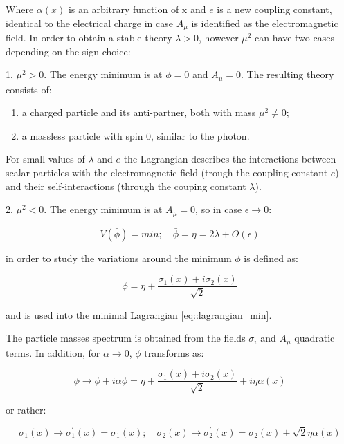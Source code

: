 Where $\alpha(x)$ is an arbitrary function of x and $e$ is a new coupling constant, identical to the electrical charge in case $A_{\mu}$ is identified as the electromagnetic field. In order to obtain a stable theory $\lambda > 0$, however $\mu^{2}$ can have two cases depending on the sign choice:
 
1. $\mu^{2} > 0$. The energy minimum is at $\phi = 0$ and $A_{\mu} = 0$. The resulting theory consists of:

\begin{enumerate}
	\item a charged particle and its anti-partner, both with mass $\mu^{2} \neq 0$;
	\item a massless particle with spin 0, similar to the photon.
\end{enumerate}

For small values of $\lambda$ and $e$ the Lagrangian describes the interactions between scalar particles with the electromagnetic field (trough the coupling constant $e$) and their self-interactions (through the couping constant $\lambda$).

2. $\mu^{2} < 0$. The energy minimum is at $A_{\mu} = 0$, so in  case $\epsilon \rightarrow 0$:

\begin{equation}
V(\bar{\phi})=min ; \quad \bar{\phi}=\eta= 2\lambda +O(\epsilon)
\end{equation}
 
 in order to study the  variations around the minimum $\phi$ is defined as:

\begin{equation}
 \phi=\eta + \dfrac{\sigma_{1}(x) + i\sigma_{2}(x)}{\sqrt{2}} 
\end{equation}

and is used into the minimal Lagrangian \ref{eq::lagrangian_min}.

The particle masses spectrum is obtained from the fields $\sigma_{i}$ and $A_{\mu}$ quadratic terms. In addition, for $\alpha \rightarrow 0$, $\phi$ transforms as:

\begin{equation}
\phi \rightarrow \phi + i\alpha\phi = \eta + \dfrac{\sigma_{1}(x) + i\sigma_{2}(x)}{\sqrt{2}} + i\eta\alpha(x)
\end{equation}

or rather:

\begin{equation}
\sigma_{1}(x) \rightarrow \sigma^{\prime}_{1}(x) = σ_{1}(x); \quad \sigma_{2}(x) \rightarrow \sigma^{\prime}_{2}(x) = \sigma_{2}(x) + \sqrt{2}\eta\alpha(x)
\end{equation}

